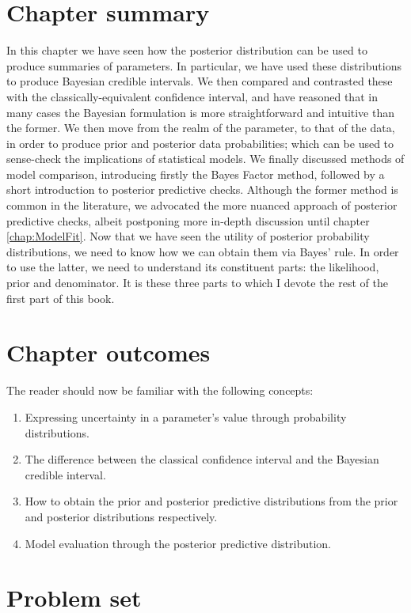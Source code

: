 \documentclass[11pt,fullpage]{book}
\begin{document}
\section{Chapter summary}
In this chapter we have seen how the posterior distribution can be used to produce summaries of parameters. In particular, we have used these distributions to produce Bayesian credible intervals. We then compared and contrasted these with the classically-equivalent confidence interval, and have reasoned that in many cases the Bayesian formulation is more straightforward and intuitive than the former. We then move from the realm of the parameter, to that of the data, in order to produce prior and posterior data probabilities; which can be used to sense-check the implications of statistical models. We finally discussed methods of model comparison, introducing firstly the Bayes Factor method, followed by a short introduction to posterior predictive checks. Although the former method is common in the literature, we advocated the more nuanced approach of posterior predictive checks, albeit postponing more in-depth discussion until chapter \ref{chap:ModelFit}. Now that we have seen the utility of posterior probability distributions, we need to know how we can obtain them via Bayes' rule. In order to use the latter, we need to understand its constituent parts: the likelihood, prior and denominator. It is these three parts to which I devote the rest of the first part of this book.

\section{Chapter outcomes}
The reader should now be familiar with the following concepts:
\begin{enumerate}
\item Expressing uncertainty in a parameter's value through probability distributions.
\item The difference between the classical confidence interval and the Bayesian credible interval.
\item How to obtain the prior and posterior predictive distributions from the prior and posterior distributions respectively.
\item Model evaluation through the posterior predictive distribution.
\end{enumerate}

\section{Problem set}
\end{document}
